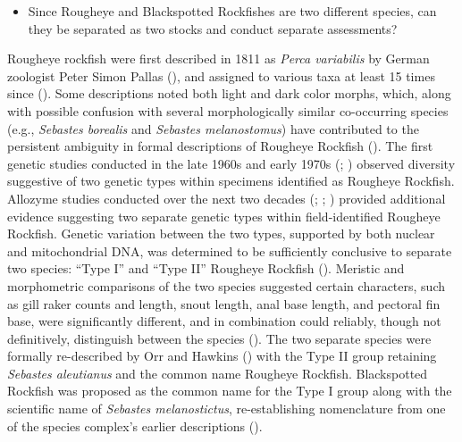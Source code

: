\documentclass[
]{scrartcl}
\providecommand{\tightlist}{%
  \setlength{\itemsep}{0pt}\setlength{\parskip}{0pt}}\usepackage{longtable,booktabs,array}
\begin{document}
\begin{itemize}
\tightlist
\item
  Since Rougheye and Blackspotted Rockfishes are two different species,
  can they be separated as two stocks and conduct separate assessments?
\end{itemize}

Rougheye rockfish were first described in 1811 as \emph{Perca
variabilis} by German zoologist Peter Simon Pallas
(), and
assigned to various taxa at least 15 times since
(). Some descriptions noted both light and dark color morphs, which,
along with possible confusion with several morphologically similar
co-occurring species (e.g., \emph{Sebastes borealis} and \emph{Sebastes
melanostomus}) have contributed to the persistent ambiguity in formal
descriptions of Rougheye Rockfish (). The first genetic studies conducted in the late
1960s and early 1970s (; ) observed diversity suggestive of two genetic types within
specimens identified as Rougheye Rockfish. Allozyme studies conducted
over the next two decades (; ; )
provided additional evidence suggesting two separate genetic types
within field-identified Rougheye Rockfish. Genetic variation between the
two types, supported by both nuclear and mitochondrial DNA, was
determined to be sufficiently conclusive to separate two species: ``Type
I'' and ``Type II'' Rougheye Rockfish
().
Meristic and morphometric comparisons of the two species suggested
certain characters, such as gill raker counts and length, snout length,
anal base length, and pectoral fin base, were significantly different,
and in combination could reliably, though not definitively, distinguish
between the species (). The two separate species were formally
re-described by Orr and Hawkins ()
with the Type II group retaining \emph{Sebastes aleutianus} and the
common name Rougheye Rockfish. Blackspotted Rockfish was proposed as the
common name for the Type I group along with the scientific name of
\emph{Sebastes melanostictus}, re-establishing nomenclature from one of
the species complex's earlier descriptions
().
\end{document}
